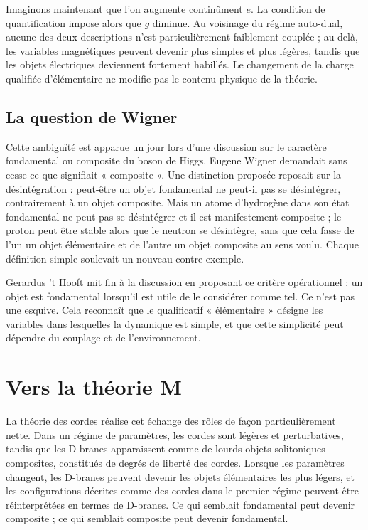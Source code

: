 Imaginons maintenant que l’on augmente continûment \(e\). La condition de quantification impose alors que \(g\) diminue. Au voisinage du régime auto-dual, aucune des deux descriptions n’est particulièrement faiblement couplée ; au-delà, les variables magnétiques peuvent devenir plus simples et plus légères, tandis que les objets électriques deviennent fortement habillés. Le changement de la charge qualifiée d’élémentaire ne modifie pas le contenu physique de la théorie.

\subsection{La question de Wigner}

Cette ambiguïté est apparue un jour lors d’une discussion sur le caractère fondamental ou composite du boson de Higgs. Eugene Wigner demandait sans cesse ce que signifiait « composite ». Une distinction proposée reposait sur la désintégration : peut-être un objet fondamental ne peut-il pas se désintégrer, contrairement à un objet composite. Mais un atome d’hydrogène dans son état fondamental ne peut pas se désintégrer et il est manifestement composite ; le proton peut être stable alors que le neutron se désintègre, sans que cela fasse de l’un un objet élémentaire et de l’autre un objet composite au sens voulu. Chaque définition simple soulevait un nouveau contre-exemple.

Gerardus 't Hooft mit fin à la discussion en proposant ce critère opérationnel : un objet est fondamental lorsqu’il est utile de le considérer comme tel. Ce n’est pas une esquive. Cela reconnaît que le qualificatif « élémentaire » désigne les variables dans lesquelles la dynamique est simple, et que cette simplicité peut dépendre du couplage et de l’environnement.

\section{Vers la théorie M}

La théorie des cordes réalise cet échange des rôles de façon particulièrement nette. Dans un régime de paramètres, les cordes sont légères et perturbatives, tandis que les D-branes apparaissent comme de lourds objets solitoniques composites, constitués de degrés de liberté des cordes. Lorsque les paramètres changent, les D-branes peuvent devenir les objets élémentaires les plus légers, et les configurations décrites comme des cordes dans le premier régime peuvent être réinterprétées en termes de D-branes. Ce qui semblait fondamental peut devenir composite ; ce qui semblait composite peut devenir fondamental.

